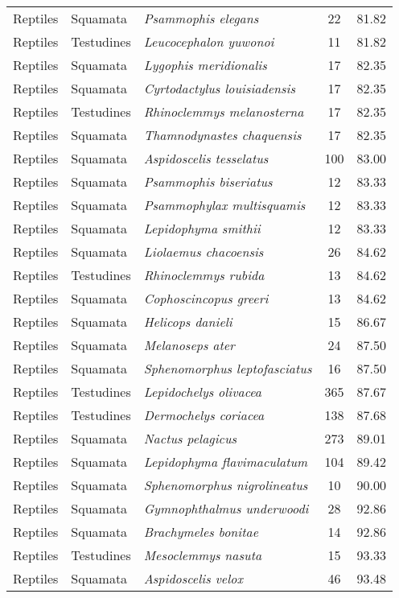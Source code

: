 \begin{longtable}{ll>{\itshape}lcc}
  Reptiles & Squamata & Psammophis elegans &  22 & 81.82 \\ 
  Reptiles & Testudines & Leucocephalon yuwonoi &  11 & 81.82 \\ 
  Reptiles & Squamata & Lygophis meridionalis &  17 & 82.35 \\ 
  Reptiles & Squamata & Cyrtodactylus louisiadensis &  17 & 82.35 \\ 
  Reptiles & Testudines & Rhinoclemmys melanosterna &  17 & 82.35 \\ 
  Reptiles & Squamata & Thamnodynastes chaquensis &  17 & 82.35 \\ 
  Reptiles & Squamata & Aspidoscelis tesselatus & 100 & 83.00 \\ 
  Reptiles & Squamata & Psammophis biseriatus &  12 & 83.33 \\ 
  Reptiles & Squamata & Psammophylax multisquamis &  12 & 83.33 \\ 
  Reptiles & Squamata & Lepidophyma smithii &  12 & 83.33 \\ 
  Reptiles & Squamata & Liolaemus chacoensis &  26 & 84.62 \\ 
  Reptiles & Testudines & Rhinoclemmys rubida &  13 & 84.62 \\ 
  Reptiles & Squamata & Cophoscincopus greeri &  13 & 84.62 \\ 
  Reptiles & Squamata & Helicops danieli &  15 & 86.67 \\ 
  Reptiles & Squamata & Melanoseps ater &  24 & 87.50 \\ 
  Reptiles & Squamata & Sphenomorphus leptofasciatus &  16 & 87.50 \\ 
  Reptiles & Testudines & Lepidochelys olivacea & 365 & 87.67 \\ 
  Reptiles & Testudines & Dermochelys coriacea & 138 & 87.68 \\ 
  Reptiles & Squamata & Nactus pelagicus & 273 & 89.01 \\ 
  Reptiles & Squamata & Lepidophyma flavimaculatum & 104 & 89.42 \\ 
  Reptiles & Squamata & Sphenomorphus nigrolineatus &  10 & 90.00 \\ 
  Reptiles & Squamata & Gymnophthalmus underwoodi &  28 & 92.86 \\ 
  Reptiles & Squamata & Brachymeles bonitae &  14 & 92.86 \\ 
  Reptiles & Testudines & Mesoclemmys nasuta &  15 & 93.33 \\ 
  Reptiles & Squamata & Aspidoscelis velox &  46 & 93.48 \\ 

\end{longtable}
